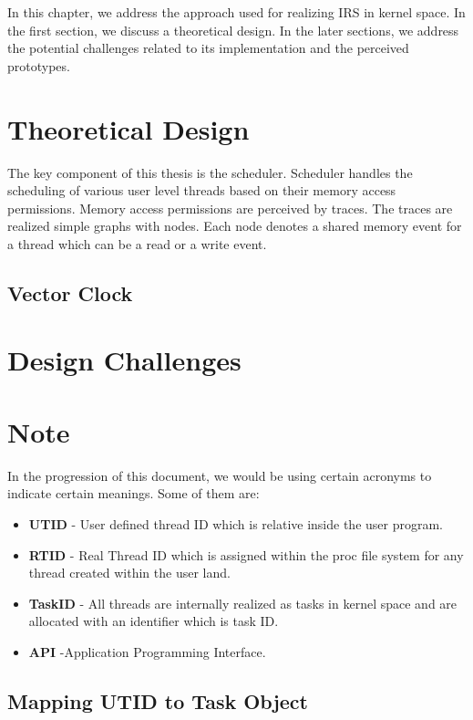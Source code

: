 
In this chapter, we address the approach used for realizing IRS in kernel space. 
In the first section, we discuss a theoretical design. 
In the later sections, we address the potential challenges related to its implementation and the perceived prototypes.

\section{Theoretical Design}

The key component of this thesis is the scheduler. 
Scheduler handles the scheduling of various user level threads based on their memory access permissions. 
Memory access permissions are perceived by traces. 
The traces are realized simple graphs with nodes. 
Each node denotes a shared memory event for a thread which can be a read or a write event. 

\subsection{Vector Clock}

\section{Design Challenges}

\section*{Note}
In the progression of this document, we would be using certain acronyms to indicate certain meanings. 
Some of them are:
\begin{itemize}
\item \textbf{UTID} - User defined thread ID which is relative inside the user program. 
\item \textbf{RTID} - Real Thread ID which is assigned within the proc file system for any thread created within the user land. 
\item \textbf{TaskID} - All threads are internally realized as tasks in kernel space and are allocated with an identifier which is task ID.
\item \textbf{API} -Application Programming Interface.
\end{itemize}

\subsection{Mapping UTID to Task Object}

